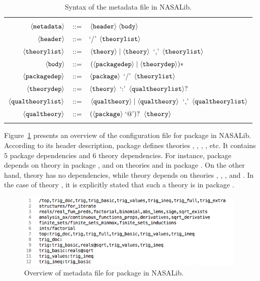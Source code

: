 \begin{table}
  \centering
  \begin{tabular}{r c p{8cm}}
    \hline \\
    $\langle{\texttt{metadata}}\rangle$ & ::= & $\langle{\texttt{header}}\rangle \; \langle{\texttt{body}}\rangle$ \\
    $\langle{\texttt{header}}\rangle$ & ::= & `/' $\langle{\texttt{theorylist}}\rangle$ \\
    $\langle{\texttt{theorylist}}\rangle$ & ::= & $\langle{\texttt{theory}}\rangle \mid \langle{\texttt{theory}}\rangle$ `,' $\langle{\texttt{theorylist}}\rangle$ \\
    $\langle{\texttt{body}}\rangle$ & ::= & $(\langle{\texttt{packagedep}}\rangle \mid \langle{\texttt{theorydep}}\rangle)*$ \\
    $\langle{\texttt{packagedep}}\rangle$ & ::= & $\langle{\texttt{package}}\rangle$ `/' $\langle{\texttt{theorylist}}\rangle$ \\
    $\langle{\texttt{theorydep}}\rangle$ & ::= & $\langle{\texttt{theory}}\rangle$ `:' $\langle{\texttt{qualtheorylist}}\rangle ?$ \\
    $\langle{\texttt{qualtheorylist}}\rangle$ & ::= & $\langle{\texttt{qualtheory}}\rangle \mid \langle{\texttt{qualtheory}}\rangle$ `,' $\langle{\texttt{qualtheorylist}}\rangle$ \\
    $\langle{\texttt{qualtheory}}\rangle$ & ::= & $(\langle{\texttt{package}}\rangle\; \text{`@'})?$ $\langle{\texttt{theory}}\rangle$ \\
    \\
    \hline
  \end{tabular}
  \caption{Syntax of the  metadata file in NASALib.}
  \label{tab.bnf}
\end{table}

Figure~\ref{fig.top} presents an overview of the configuration file
for package  in NASALib. According to its header
description, package  defines theories ,
, , , etc. It contains $5$
package dependencies and $6$ theory dependencies. For instance,
package  depends on theory  in package
, and on theories  and
 in package . On the
other hand, theory  has no dependencies, while theory
 depends on theories , ,
, and . In the case of theory
, it is explicitly stated that such a theory is in package
.

\begin{figure}
  \centering
  \includegraphics[width=11cm]{images/top.png}
  \caption{Overview of metadata file for package  in NASALib.}
  \label{fig.top}
\end{figure}
